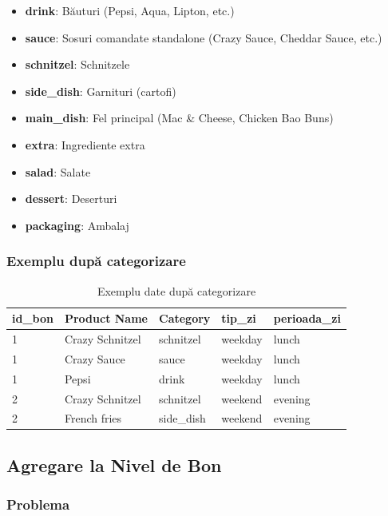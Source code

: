 \documentclass[12pt,a4paper]{article}
\begin{document}
\begin{itemize}
    \item \textbf{drink}: Băuturi (Pepsi, Aqua, Lipton, etc.)
    \item \textbf{sauce}: Sosuri comandate standalone (Crazy Sauce, Cheddar Sauce, etc.)
    \item \textbf{schnitzel}: Schnitzele
    \item \textbf{side\_dish}: Garnituri (cartofi)
    \item \textbf{main\_dish}: Fel principal (Mac \& Cheese, Chicken Bao Buns)
    \item \textbf{extra}: Ingrediente extra
    \item \textbf{salad}: Salate
    \item \textbf{dessert}: Deserturi
    \item \textbf{packaging}: Ambalaj
\end{itemize}

\subsubsection*{Exemplu după categorizare}

\begin{table}[h]
    \centering
    \caption{Exemplu date după categorizare}
    \vspace{0.2cm}
    \begin{tabular}{lllll}
        \toprule
        \textbf{id\_bon} & \textbf{Product Name} & \textbf{Category} & \textbf{tip\_zi} & \textbf{perioada\_zi} \\
        \midrule
        1 & Crazy Schnitzel & schnitzel & weekday & lunch \\
        1 & Crazy Sauce & sauce & weekday & lunch \\
        1 & Pepsi & drink & weekday & lunch \\
        2 & Crazy Schnitzel & schnitzel & weekend & evening \\
        2 & French fries & side\_dish & weekend & evening \\
        \bottomrule
    \end{tabular}
\end{table}

\subsection{Agregare la Nivel de Bon}

\subsubsection*{Problema}
\end{document}
